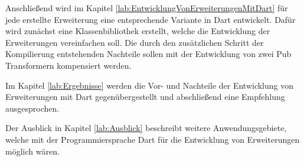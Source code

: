 Anschließend wird im Kapitel \ref{lab:EntwicklungVonErweiterungenMitDart} für jede erstellte Erweiterung eine entsprechende Variante in Dart entwickelt. Dafür wird zunächst eine Klassenbibliothek erstellt, welche die Entwicklung der Erweiterungen vereinfachen soll. Die durch den zusätzlichen Schritt der Kompilierung entstehenden Nachteile sollen mit der Entwicklung von zwei Pub Transformern kompensiert werden.

Im Kapitel \ref{lab:Ergebnisse} werden die Vor- und Nachteile der Entwicklung von Erweiterungen mit Dart gegenübergestellt und abschließend eine Empfehlung ausgesprochen.

Der Ausblick in Kapitel \ref{lab:Ausblick} beschreibt weitere Anwendungsgebiete, welche mit der Programmier\-sprache Dart für die Entwicklung von Erweiterungen möglich wären.

